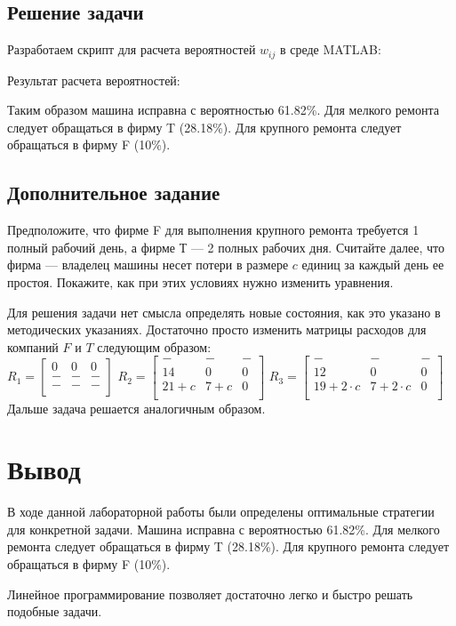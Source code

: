 \documentclass[14pt,a4paper,report]{report}
\begin{document}
\subsection{Решение задачи}

Разработаем скрипт для расчета вероятностей $w_{ij}$ в среде MATLAB:



Результат расчета вероятностей:



Таким образом машина исправна с вероятностью 61.82\%. Для мелкого ремонта следует обращаться в фирму T (28.18\%). Для крупного ремонта следует обращаться в фирму F (10\%).

\subsection{Дополнительное задание}

Предположите, что фирме F для выполнения крупного ремонта требуется 1 полный рабочий день, а фирме Т — 2 полных рабочих
дня. Считайте далее, что фирма — владелец машины несет потери в размере $c$ единиц за каждый день ее простоя. Покажите, как при этих условиях нужно изменить уравнения.

Для решения задачи нет смысла определять новые состояния, как это указано в методических указаниях. Достаточно просто изменить матрицы расходов для компаний $F$ и $T$ следующим образом:\\

$
R_1=\begin{bmatrix}
0 & 0 & 0 \\
- & - & - \\
- & - & - \\
\end{bmatrix}
$
$
R_2=\begin{bmatrix}
- & - & - \\
14 & 0 & 0 \\
21 + c & 7 + c & 0 \\
\end{bmatrix}
$
$
R_3=\begin{bmatrix}
- & - & - \\
12 & 0 & 0 \\
19 + 2\cdot c & 7 + 2\cdot c & 0 \\
\end{bmatrix}
$\\

Дальше задача решается аналогичным образом.

\section{Вывод}

В ходе данной лабораторной работы были определены оптимальные стратегии для конкретной задачи. Машина исправна с вероятностью 61.82\%. Для мелкого ремонта следует обращаться в фирму T (28.18\%). Для крупного ремонта следует обращаться в фирму F (10\%).

Линейное программирование позволяет достаточно легко и быстро решать подобные задачи.
\end{document}
